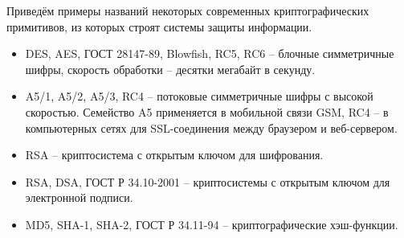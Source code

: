 Приведём примеры названий некоторых современных криптографических примитивов, из которых строят системы защиты информации.
\begin{itemize}
    \item DES, AES, ГОСТ 28147-89, Blowfish, RC5, RC6 -- блочные симметричные шифры, скорость обработки -- десятки мегабайт в секунду.
    \item A5/1, A5/2, A5/3, RC4 -- потоковые симметричные шифры с высокой скоростью. Семейство A5 применяется в мобильной связи GSM, RC4 -- в компьютерных сетях для SSL-соединения между браузером и веб-сервером.
    \item RSA -- криптосистема с открытым ключом для шифрования.
    \item RSA, DSA, ГОСТ Р 34.10-2001 -- криптосистемы с открытым ключом для электронной подписи.
    \item MD5, SHA-1, SHA-2, ГОСТ Р 34.11-94 -- криптографические хэш-функции.
\end{itemize}




